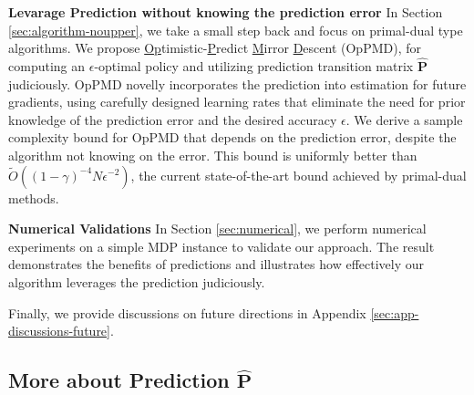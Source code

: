 \documentclass[12pt]{article}
\begin{document}
\textbf{Levarage Prediction without knowing the prediction error} In Section \ref{sec:algorithm-noupper}, we take a small step back and focus on primal-dual type algorithms.
We propose \underline{Op}timistic-\underline{P}redict \underline{M}irror \underline{D}escent (OpPMD), for computing an $\epsilon$-optimal policy and utilizing prediction transition matrix $\hat{\boldsymbol{\text{P}}}$ judiciously. OpPMD novelly incorporates the prediction into estimation for future gradients, using carefully designed learning rates that eliminate the need for prior knowledge of the prediction error and the desired accuracy $\epsilon$. We derive a sample complexity bound for OpPMD that depends on the prediction error, despite the algorithm not knowing on the error. This bound is uniformly better than $\tilde{O}((1-\gamma)^{-4} N \epsilon^{-2})$, the current state-of-the-art bound achieved by primal-dual methods. 

\textbf{Numerical Validations} In Section \ref{sec:numerical}, we perform numerical experiments on a simple MDP instance to validate our approach. The result demonstrates the benefits of predictions and illustrates how effectively our algorithm leverages the prediction judiciously.

Finally, we provide discussions on future directions in Appendix \ref{sec:app-discussions-future}.


\subsection{More about Prediction $\hat{\boldsymbol{\text{P}}}$}
\end{document}
